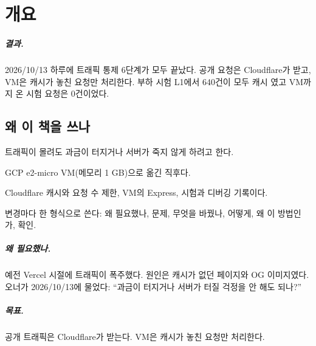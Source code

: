 \chapter{개요}\label{ch:overview}

\paragraph{결과.}
2026/10/13 하루에 트래픽 통제 6단계가 모두 끝났다.
공개 요청은 Cloudflare가 받고, VM은 캐시가 놓친 요청만 처리한다.
부하 시험 L1에서 640건이 모두 캐시 였고 VM까지 온 시험 요청은 0건이었다.

\section{왜 이 책을 쓰나}\label{sec:ov-why}

\begin{inbrief}
  \item[Why] 트래픽이 몰려도 과금이 터지거나 서버가 죽지 않게 하려고 한다.
  \item[When] GCP e2-micro VM(메모리 1 GB)으로 옮긴 직후다.
  \item[Where] Cloudflare 캐시와 요청 수 제한, VM의 Express, 시험과 디버깅 기록이다.
  \item[How] 변경마다 한 형식으로 쓴다: 왜 필요했나, 문제, 무엇을 바꿨나, 어떻게, 왜 이 방법인가, 확인.
\end{inbrief}

\paragraph{왜 필요했나.}
예전 Vercel 시절에 트래픽이 폭주했다.
원인은 캐시가 없던 페이지와 OG 이미지였다.
오너가 2026/10/13에 물었다: ``과금이 터지거나 서버가 터질 걱정을 안 해도 되나?''

\paragraph{목표.}
공개 트래픽은 Cloudflare가 받는다.
VM은 캐시가 놓친 요청만 처리한다.

